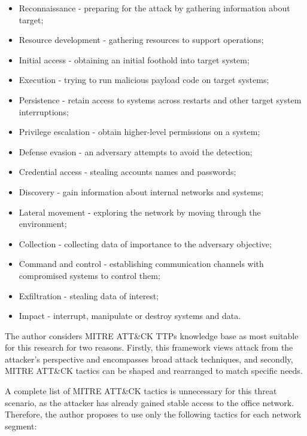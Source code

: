 \begin{itemize}
	\item Reconnaissance - preparing for the attack by gathering information about target;
	\item Resource development - gathering resources to support operations;
	\item Initial access - obtaining an initial foothold into target system; 
	\item Execution - trying to run malicious payload code on target systems; 
	\item Persistence - retain access to systems across restarts and other target system interruptions;
	\item Privilege escalation - obtain higher-level permissions on a system;
	\item Defense evasion - an adversary attempts to avoid the detection;
	\item Credential access - stealing accounts names and passwords;                   
	\item Discovery - gain information about internal networks and systems;            
	\item Lateral movement - exploring the network by moving through the environment; 
	\item Collection - collecting data of importance to the adversary objective;
	\item Command and control - establishing communication channels with compromised systems to control them;
	\item Exfiltration - stealing data of interest;
	\item Impact - interrupt, manipulate or destroy systems and data.
	
\end{itemize}

The author considers MITRE ATT\&CK TTPs knowledge base as most suitable for this research for two reasons. Firstly, this framework views attack from the attacker's perspective and encompasses broad attack techniques, and secondly, MITRE ATT\&CK tactics can be shaped and rearranged to match specific needs.

A complete list of MITRE ATT\&CK tactics is unnecessary for this threat scenario, as the attacker has already gained stable access to the office network. Therefore, the author proposes to use only the following tactics for each network segment:

